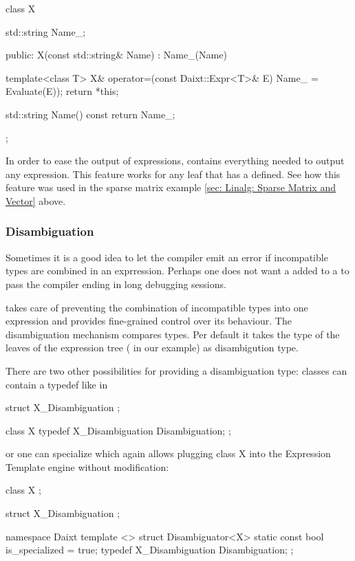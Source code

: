 \begin{code}
class X 
{
  std::string Name_;

public:
  X(const std::string& Name) : Name_(Name) {}

  template<class T>
  X& operator=(const Daixt::Expr<T>& E)
  {
    Name_ = Evaluate(E));
    return *this;
  }

  std::string Name() const { return Name_; }
};
\end{code}

In order to ease the output of expressions,  
 contains everything needed to
output any expression. This feature works for any leaf  that has
a  defined.
See how this feature was used in the sparse matrix example 
\ref{sec: Linalg: Sparse Matrix and Vector} above.  
 

\subsubsection{Disambiguation}

Sometimes it is a good idea to let the compiler emit an error 
if incompatible types are combined in an exprression. Perhaps one 
does not want a 
 added to a  to pass the compiler
ending in long debugging sessions. 

\Daixtrose takes care of preventing the combination of incompatible types into 
one expression and provides fine-grained control over its behaviour.
The disambiguation mechanism compares types. Per default it takes the type of
the leaves of the expression tree ( in our example) as
disambigution type. 

There are two other possibilities for providing a disambiguation type:
classes can contain a typedef like in
%
\begin{code}
struct X_Disambiguation {};

class X {
  typedef X_Disambiguation Disambiguation;
};
\end{code}
%
or one can specialize  which again allows
plugging class X into the Expression Template engine without modification:
%
\begin{code}
class X {};

struct X_Disambiguation {};

namespace Daixt 
{ 
template <> 
struct Disambiguator<X> 
{
  static const bool is_specialized = true;
  typedef X_Disambiguation Disambiguation;
};
}
\end{code}

